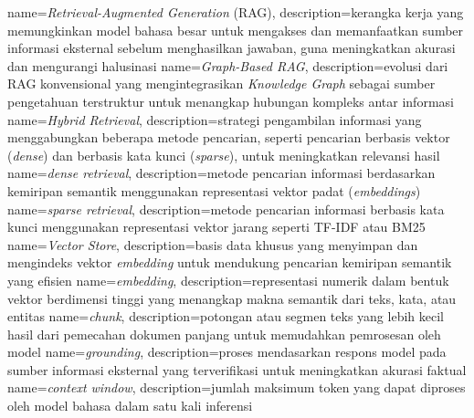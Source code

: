 {
	name={\textit{Retrieval-Augmented Generation} (RAG)},
	description={kerangka kerja yang memungkinkan model bahasa besar untuk mengakses dan memanfaatkan sumber informasi eksternal sebelum menghasilkan jawaban, guna meningkatkan akurasi dan mengurangi halusinasi}
}
{
	name={\textit{Graph-Based RAG}},
	description={evolusi dari RAG konvensional yang mengintegrasikan \textit{Knowledge Graph} sebagai sumber pengetahuan terstruktur untuk menangkap hubungan kompleks antar informasi}
}
{
	name={\textit{Hybrid Retrieval}},
	description={strategi pengambilan informasi yang menggabungkan beberapa metode pencarian, seperti pencarian berbasis vektor (\textit{dense}) dan berbasis kata kunci (\textit{sparse}), untuk meningkatkan relevansi hasil}
}
{
	name={\textit{dense retrieval}},
	description={metode pencarian informasi berdasarkan kemiripan semantik menggunakan representasi vektor padat (\textit{embeddings})}
}
{
	name={\textit{sparse retrieval}},
	description={metode pencarian informasi berbasis kata kunci menggunakan representasi vektor jarang seperti TF-IDF atau BM25}
}
{
	name={\textit{Vector Store}},
	description={basis data khusus yang menyimpan dan mengindeks vektor \textit{embedding} untuk mendukung pencarian kemiripan semantik yang efisien}
}
{
	name={\textit{embedding}},
	description={representasi numerik dalam bentuk vektor berdimensi tinggi yang menangkap makna semantik dari teks, kata, atau entitas}
}
{
	name={\textit{chunk}},
	description={potongan atau segmen teks yang lebih kecil hasil dari pemecahan dokumen panjang untuk memudahkan pemrosesan oleh model}
}
{
	name={\textit{grounding}},
	description={proses mendasarkan respons model pada sumber informasi eksternal yang terverifikasi untuk meningkatkan akurasi faktual}
}
{
	name={\textit{context window}},
	description={jumlah maksimum token yang dapat diproses oleh model bahasa dalam satu kali inferensi}
}

